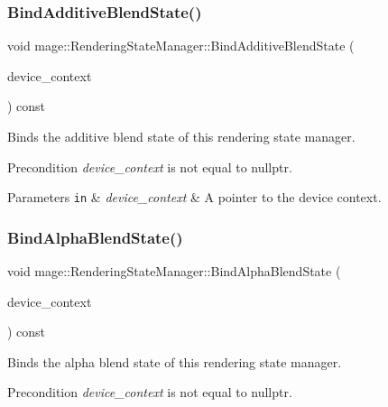 \subsubsection{\texorpdfstring{Bind\+Additive\+Blend\+State()}{BindAdditiveBlendState()}}
{\footnotesize\ttfamily void mage\+::\+Rendering\+State\+Manager\+::\+Bind\+Additive\+Blend\+State (\begin{DoxyParamCaption}\item[{I\+D3\+D11\+Device\+Context2 $\ast$}]{device\+\_\+context }\end{DoxyParamCaption}) const\hspace{0.3cm}{\ttfamily [noexcept]}}

Binds the additive blend state of this rendering state manager.

\begin{DoxyPrecond}{Precondition}
{\itshape device\+\_\+context} is not equal to {\ttfamily nullptr}. 
\end{DoxyPrecond}

\begin{DoxyParams}[1]{Parameters}
\mbox{\tt in}  & {\em device\+\_\+context} & A pointer to the device context. \\
\hline
\end{DoxyParams}
\hypertarget{classmage_1_1_rendering_state_manager_a5f7b81f0ce25092588cbfba94e6daa7e}{}\label{classmage_1_1_rendering_state_manager_a5f7b81f0ce25092588cbfba94e6daa7e} 
\subsubsection{\texorpdfstring{Bind\+Alpha\+Blend\+State()}{BindAlphaBlendState()}}
{\footnotesize\ttfamily void mage\+::\+Rendering\+State\+Manager\+::\+Bind\+Alpha\+Blend\+State (\begin{DoxyParamCaption}\item[{I\+D3\+D11\+Device\+Context2 $\ast$}]{device\+\_\+context }\end{DoxyParamCaption}) const\hspace{0.3cm}{\ttfamily [noexcept]}}

Binds the alpha blend state of this rendering state manager.

\begin{DoxyPrecond}{Precondition}
{\itshape device\+\_\+context} is not equal to {\ttfamily nullptr}. 
\end{DoxyPrecond}

